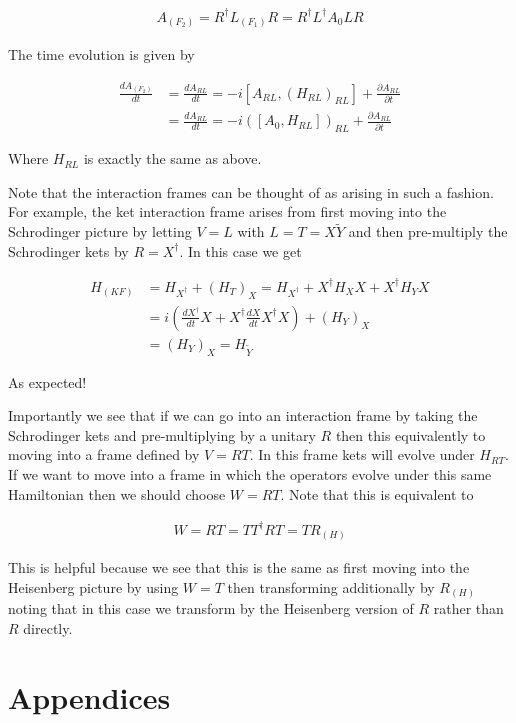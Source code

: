 \documentclass[12pt]{article}
\newcommand{\ddt}[1]{\frac{d #1}{dt}}
\newcommand{\ppt}[1]{\frac{\partial #1}{\partial t}}
\begin{document}
\begin{align}
A_{(F_2)} = R^{\dag} L_{(F_1)} R = R^{\dag} L^{\dag} A_0 LR
\end{align}

The time evolution is given by

\begin{align}
\ddt{A_{(F_2)}} &= \ddt{A_{RL}} = -i[A_{RL},(H_{RL})_{RL}] + \ppt{A_{RL}}\\
&= \ddt{A_{RL}} = -i\left([A_0,H_{RL}]\right)_{RL} + \ppt{A_{RL}}
\end{align}

Where $H_{RL}$ is exactly the same as above.

Note that the interaction frames can be thought of as arising in such a fashion. For example, the ket interaction frame arises from first moving into the Schrodinger picture by letting $V=L$ with $L=T=X\tilde{Y}$ and then pre-multiply the Schrodinger kets by $R=X^{\dag}$. In this case we get

\begin{align}
H_{(KF)} &= H_{X^{\dag}} + (H_T)_X = H_{X^{\dag}} + X^{\dag} H_X X + X^{\dag}H_Y X\\
&= i\left(\ddt{X^{\dag}}X + X^{\dag} \ddt{X}X^{\dag} X \right) + (H_Y)_X\\
&= (H_Y)_X = H_{\tilde{Y}}
\end{align}

As expected!

Importantly we see that if we can go into an interaction frame by taking the Schrodinger kets and pre-multiplying by a unitary $R$ then this equivalently to moving into a frame defined by $V=RT$. In this frame kets will evolve under $H_{RT}$. If we want to move into a frame in which the operators evolve under this same Hamiltonian then we should choose $W=RT$. Note that this is equivalent to 

\begin{align}
W=RT =TT^{\dag}RT = TR_{(H)}
\end{align}

This is helpful because we see that this is the same as first moving into the Heisenberg picture by using $W=T$ then transforming additionally by $R_{(H)}$ noting that in this case we transform by the Heisenberg version of $R$ rather than $R$ directly.

\section{Appendices}
\end{document}
